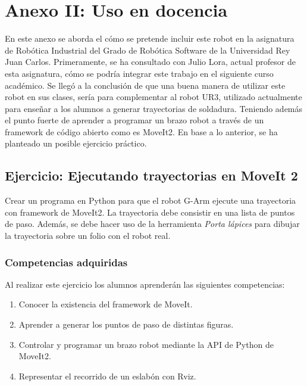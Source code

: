\chapter*{Anexo II: Uso en docencia}
\label{cap:anexoii}

\noindent En este anexo se aborda el cómo se pretende incluir este robot en la asignatura de Robótica Industrial del Grado de Robótica Software 
de la Universidad Rey Juan Carlos. Primeramente, 
se ha consultado con Julio Lora, actual profesor de esta asignatura, cómo se podría integrar este trabajo en el siguiente curso académico. Se llegó 
a la conclusión de que una buena manera de utilizar este robot en sus clases, sería para complementar al robot UR3, utilizado actualmente 
para enseñar a los alumnos a generar trayectorias de soldadura. Teniendo además el punto fuerte de aprender a programar un brazo robot a través de un framework 
de código abierto como es MoveIt2. En base a lo anterior, se ha planteado un posible ejercicio práctico.

\section*{Ejercicio: Ejecutando trayectorias en MoveIt 2}
\noindent Crear un programa en Python para que el robot G-Arm ejecute una trayectoria con framework de MoveIt2. La trayectoria debe consistir 
en una lista de puntos de paso. Además, se debe hacer uso de la herramienta \textit{Porta lápices} para dibujar la trayectoria sobre un folio 
con el robot real. 

\subsection*{Competencias adquiridas}
\noindent Al realizar este ejercicio los alumnos aprenderán las siguientes competencias:
\begin{enumerate}
    \item Conocer la existencia del framework de MoveIt.
    \item Aprender a generar los puntos de paso de distintas figuras.
    \item Controlar y programar un brazo robot mediante la API de Python de MoveIt2.
    \item Representar el recorrido de un eslabón con Rviz.    
\end{enumerate}

\newpage

